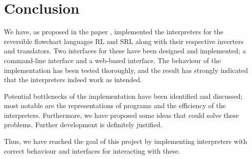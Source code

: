 \chapter*{Conclusion}
 

We have, as proposed in the paper \cite{REV}, implemented the interpreters for the reversible flowchart languages RL and SRL along with their respective inverters and translators. Two interfaces for these have been designed and implemented; a command-line interface and a web-based interface. The behaviour of the implementation has been tested thoroughly, and the result has strongly indicated that the interpreters indeed work as intended.

Potential bottlenecks of the implementation have been identified and discussed; most notable are the representations of programs and the efficiency of the interpreters. Furthermore, we have proposed some ideas that could solve these problems. Further development is definitely justified.


Thus, we have reached the goal of this project by implementing interpreters with correct behaviour and interfaces for interacting with these.
